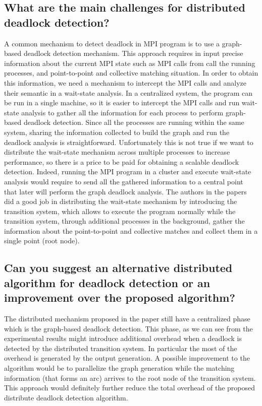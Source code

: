 \begin{refsection}
\subsection*{What are the main challenges for distributed deadlock
  detection?}
\label{sec:member32}

A common mechanism to detect deadlock in MPI program is to use a graph-based
deadlock detection mechanism.
%
This approach requires in input precise information about the current MPI
state such as MPI calls from call the running processes, and point-to-point
and collective matching situation.
%
In order to obtain this information, we need a mechanism to intercept the MPI
calls and analyze their semantic in a wait-state analysis.
%
In a centralized system, the program can be run in a single machine, so it is
easier to intercept the MPI calls and run wait-state analysis to gather all
the information for each process to perform graph-based deadlock detection.
%
Since all the processes are running within the same system, sharing the
information collected to build the graph and run the deadlock analysis is
straightforward.
%
Unfortunately this is not true if we want to distribute the wait-state
mechanism across multiple processes to increase performance, so there is a
price to be paid for obtaining a scalable deadlock detection.
%
Indeed, running the MPI program in a cluster and execute wait-state analysis
would require to send all the gathered information to a central point that
later will perform the graph deadlock analysis.
%
The authors in the papers did a good job in distributing the wait-state
mechanism by introducing the transition system, which allows to execute the
program normally while the transition system, through additional processes in
the background, gather the information about the point-to-point and collective
matches and collect them in a single point (root node).

\subsection*{Can you suggest an alternative distributed algorithm for
  deadlock detection or an improvement over the proposed algorithm?}
\label{sec:member33}

The distributed mechanism proposed in the paper still have a centralized
phase which is the graph-based deadlock detection.
%
This phase, as we can see from the experimental results might introduce
additional overhead when a deadlock is detected by the distributed transition
system.
%
In particular the most of the overhead is generated by the output generation.
%
A possible improvement to the algorithm would be to parallelize the graph
generation while the matching information (that forms an arc) arrives to the
root node of the transition system.
%
This approach would definitely further reduce the total overhead of the
proposed distribute deadlock detection algorithm.


\end{refsection}
